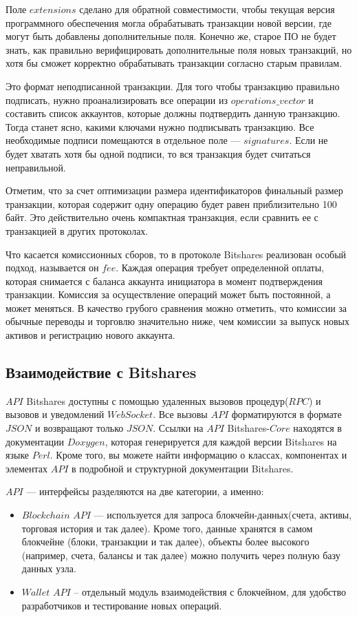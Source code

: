\documentclass[a4paper, 14pt]{extarticle}
\begin{document}
Поле $extensions$ сделано для обратной совместимости, чтобы текущая версия программного обеспечения могла обрабатывать транзакции новой версии, где могут быть добавлены дополнительные поля. Конечно же, старое ПО не будет знать, как правильно верифицировать дополнительные поля новых транзакций, но хотя бы сможет корректно обрабатывать транзакции согласно старым правилам.

Это формат неподписанной транзакции. Для того чтобы транзакцию правильно подписать, нужно проанализировать все операции из $operations\_vector$ и составить список аккаунтов, которые должны подтвердить данную транзакцию. Тогда станет ясно, какими ключами нужно подписывать транзакцию. Все необходимые подписи помещаются в отдельное поле — $signatures$. Если не будет хватать хотя бы одной подписи, то вся транзакция будет считаться неправильной.

Отметим, что за счет оптимизации размера идентификаторов финальный размер транзакции, которая содержит одну операцию будет равен приблизительно 100 байт. Это действительно очень компактная транзакция, если сравнить ее с транзакцией в других протоколах.

Что касается комиссионных сборов, то в протоколе Bitshares реализован особый подход, называется он $fee$. Каждая операция требует определенной оплаты, которая снимается с баланса аккаунта инициатора в момент подтверждения транзакции. Комиссия за осуществление операций может быть постоянной, а может меняться. В качество грубого сравнения можно отметить, что комиссии за обычные переводы и торговлю значительно ниже, чем комиссии за выпуск новых активов и регистрацию нового аккаунта.

\subsection{Взаимодействие с Bitshares}
$API$ Bitshares доступны с помощью удаленных вызовов процедур($RPC$) и вызовов и уведомлений $WebSocket$. Все вызовы $API$ форматируются в формате $JSON$ и возвращают только $JSON$. Ссылки на $API$ Bitshares-$Core$ находятся в документации $Doxygen$, которая генерируется для каждой версии Bitshares на языке $Perl$. Кроме того, вы можете найти информацию о классах, компонентах и элементах $API$ в подробной и структурной документации Bitshares.

$API$ --- интерфейсы разделяются на две категории, а именно:

\begin{itemize}
    \item $Blockchain$ $API$ --- используется для запроса блокчейн-данных(счета, активы, торговая история и так далее). Кроме того, данные хранятся в самом блокчейне (блоки, транзакции и так далее), объекты более высокого  (например, счета, балансы и так далее) можно получить через полную базу данных узла.
    \item $Wallet$ $API$ – отдельный модуль взаимодействия с блокчейном, для удобство разработчиков и тестирование новых операций.
\end{itemize}
\end{document}
